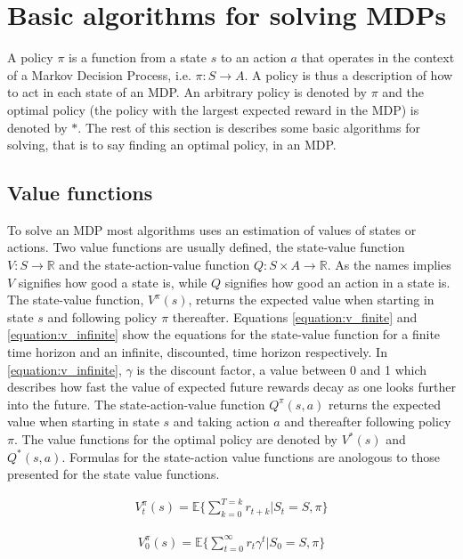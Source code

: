 \section{Basic algorithms for solving MDPs}

A policy $\pi$ is a function from a state $s$ to an action $a$ that operates in
the context of a Markov Decision Process, i.e. $\pi \colon S \to A$. A policy
is thus a description of how to act in each state of an MDP. An arbitrary
policy is denoted by $\pi$ and the optimal policy (the policy with the largest
expected reward in the MDP) is denoted by $*$. The rest of this section is
describes some basic algorithms for solving, that is to say finding an optimal
policy, in an MDP.

\subsection{Value functions}

To solve an MDP most algorithms uses an estimation of values of states or
actions. Two value functions are usually defined, the state-value function $V :
S \to \mathbb R$ and the state-action-value function $Q : S \times A \to
\mathbb R$. As the names implies $V$ signifies how good a state is, while $Q$
signifies how good an action in a state is. The state-value function,
$V^\pi(s)$, returns the expected value when starting in state $s$ and following
policy $\pi$ thereafter. Equations \eqref{equation:v_finite} and \eqref{equation:v_infinite} show the equations for the state-value function for a finite time horizon and an infinite, discounted, time horizon respectively. In \eqref{equation:v_infinite}, $\gamma$ is the discount factor, a value between 0 and 1 which describes how fast the value of expected future rewards decay as one looks further into the future. The state-action-value function $Q^\pi(s, a)$ returns
the expected value when starting in state $s$ and taking action $a$ and
thereafter following policy $\pi$. The value functions for the optimal policy
are denoted by $V^*(s)$ and $Q^*(s, a)$. Formulas for the state-action value functions are anologous to those presented for the state value functions. 

\begin{align}
\label{equation:v_finite}
V_t^\pi(s) = \mathbb{E} \{ \sum_{k=0}^{T=k} r_{t+k} | S_t = S, \pi \}
\end{align}

\begin{align}
\label{equation:v_infinite}
V_{0}^\pi(s) = \mathbb{E} \{ \sum_{t=0}^\infty r_{t}\gamma^t | S_0 = S,\pi \}
\end{align}

